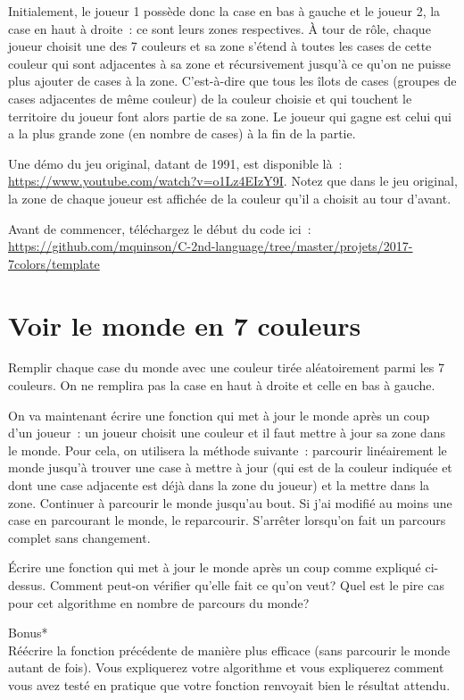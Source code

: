 \documentclass[a4paper,10pt]{article}
\begin{document}
Initialement, le joueur 1 possède donc la case en bas à gauche et le
joueur 2, la case en haut à droite~: ce sont leurs zones
respectives. À tour de rôle, chaque joueur choisit une des 7 couleurs
et sa zone s'étend à toutes les cases de cette couleur qui sont
adjacentes à sa zone et récursivement jusqu'à ce qu'on ne puisse plus
ajouter de cases à la zone. C'est-à-dire que tous les îlots de cases
(groupes de cases adjacentes de même couleur) de la couleur choisie et
qui touchent le territoire du joueur font alors partie de sa zone.  Le
joueur qui gagne est celui qui a la plus grande zone (en nombre de
cases) à la fin de la partie.

Une démo du jeu
original, datant de 1991, est disponible là~:
\url{https://www.youtube.com/watch?v=o1Lz4EIzY9I}.
Notez que dans le jeu original, la zone de chaque joueur
est affichée de la couleur qu'il a choisit au tour d'avant.


\bigskip %
Avant de commencer, téléchargez le début du code ici~:\\
\url{https://github.com/mquinson/C-2nd-language/tree/master/projets/2017-7colors/template}

\clearpage

\section{Voir le monde en 7 couleurs}
\Question Remplir chaque case du monde avec une couleur tirée aléatoirement parmi les 7 couleurs. On ne remplira pas la 
case en haut à droite et celle en bas à gauche.

On va maintenant écrire une fonction qui met à jour le monde après un coup d'un joueur~: un joueur choisit une couleur et il faut mettre à jour sa zone dans le monde. Pour cela, on utilisera la méthode suivante~: parcourir linéairement le monde jusqu'à trouver une case à mettre à jour (qui est de la couleur indiquée et dont une case adjacente est déjà dans la zone du joueur) et la mettre dans la zone. Continuer à parcourir le monde jusqu'au bout. Si j'ai modifié au moins une case en parcourant le monde, le reparcourir. S'arrêter lorsqu'on fait un parcours complet sans changement.

\Question \'Ecrire une fonction qui met à jour le monde après un coup comme expliqué ci-dessus. Comment peut-on 
vérifier qu'elle fait ce qu'on veut? Quel est le pire cas pour cet algorithme en nombre de parcours du monde?


\Question Bonus*\\
Réécrire la fonction précédente de manière plus efficace (sans parcourir le monde autant de fois). Vous expliquerez votre algorithme et vous expliquerez comment vous avez testé en pratique que votre fonction renvoyait bien le résultat attendu.
\end{document}

